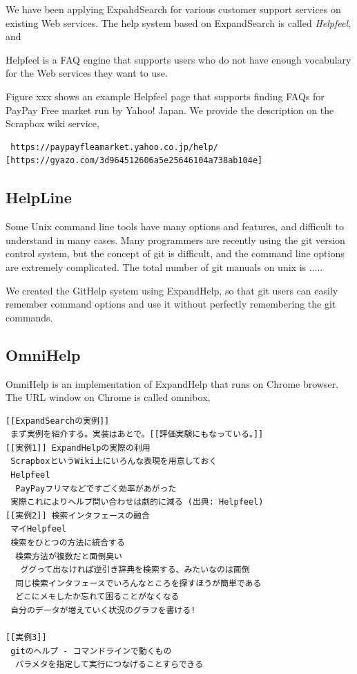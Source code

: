 \documentclass[manuscript,screen,review]{acmart}
\begin{document}
We have been applying ExpahdSearch for various customer support services on existing Web services.
The help system based on ExpandSearch is called \textit{Helpfeel}, and

Helpfeel is a FAQ engine that supports users who do not have enough vocabulary for the Web services they want to use.


Figure xxx shows an example Helpfeel page that supports finding FAQs
for PayPay Free market run by Yahoo! Japan.
We provide the description on the Scrapbox wiki service,

\begin{verbatim}
 https://paypayfleamarket.yahoo.co.jp/help/
[https://gyazo.com/3d964512606a5e25646104a738ab104e]
\end{verbatim}

\subsection{HelpLine}

Some Unix command line tools have many options and features, and difficult to understand in many cases.
Many programmers are recently using the git version control system, but the concept of git is difficult, and
the command line options are extremely complicated.
The total number of git manuals on unix is .....

We created the GitHelp system using ExpandHelp, so that git users can easily
remember command options and use it without perfectly remembering the git commands.

\subsection{OmniHelp}

OmniHelp is an implementation of ExpandHelp that runs on Chrome browser.
The URL window on Chrome is called omnibox, 

\begin{verbatim}
[[ExpandSearchの実例]]
 まず実例を紹介する。実装はあとで。[[評価実験にもなっている。]]
[[実例1]] ExpandHelpの実際の利用
 ScrapboxというWiki上にいろんな表現を用意しておく
 Helpfeel
  PayPayフリマなどですごく効率があがった
 実際これによりヘルプ問い合わせは劇的に減る (出典: Helpfeel)
[[実例2]] 検索インタフェースの融合
 マイHelpfeel
 検索をひとつの方法に統合する
  検索方法が複数だと面倒臭い
   ググって出なければ逆引き辞典を検索する、みたいなのは面倒
  同じ検索インタフェースでいろんなところを探すほうが簡単である
  どこにメモしたか忘れて困ることがなくなる
 自分のデータが増えていく状況のグラフを書ける!

[[実例3]]
 gitのヘルプ - コマンドラインで動くもの
  パラメタを指定して実行につなげることすらできる
\end{verbatim}
\end{document}
